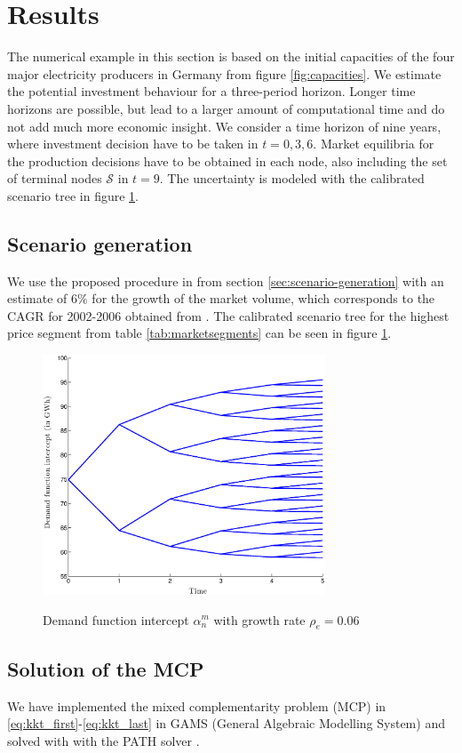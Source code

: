 \clearpage
\section{Results}
\label{sec:results}

The numerical example in this section is based on the initial capacities of the four major electricity producers in Germany from figure \ref{fig:capacities}. We estimate the potential investment behaviour for a three-period horizon. Longer time horizons are possible, but lead to a larger amount of computational time and do not add much more economic insight. We consider a time horizon of nine years, where investment decision have to be taken in $t=0,3,6$. Market equilibria for the production decisions have to be obtained in each node, also including the set of terminal nodes $\mathcal{S}$ in $t=9$.  The uncertainty is modeled with the calibrated scenario tree in figure \ref{fig:intercept}.

\subsection{Scenario generation}

We use the proposed procedure in from section \ref{sec:scenario-generation} with an estimate of $6\%$ for the growth of the market volume, which corresponds to the CAGR for 2002-2006 obtained from \cite{Datamonitor2007}. The calibrated scenario tree for the highest price segment from table \ref{tab:marketsegments} can be seen in figure \ref{fig:intercept}.

\begin{figure}[htb]
  \centering
\caption{Demand function intercept $\alpha_n^m$ with growth rate $\rho_e=0.06$}
  \includegraphics[width=0.75\textwidth]{intercept}
  \label{fig:intercept}
\end{figure}


\subsection{Solution of the MCP}

We have implemented the mixed complementarity problem (MCP) in \eqref{eq:kkt_first}-\eqref{eq:kkt_last} in GAMS (General Algebraic Modelling System) and solved with with the PATH solver \citep[see][]{Ferris2000}.

